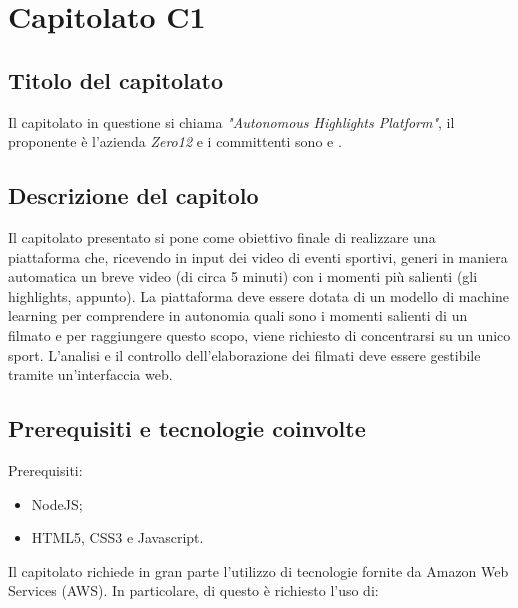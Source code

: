 \section{Capitolato C1}
\subsection{Titolo del capitolato}
Il capitolato in questione si chiama \textit{"Autonomous Highlights Platform"}, il proponente \`e l'azienda \textit{Zero12} e i committenti sono \VT{} e \CR{}.

\subsection{Descrizione del capitolo}
Il capitolato presentato si pone come obiettivo finale di realizzare una piattaforma che, ricevendo in input dei video di eventi sportivi, generi in maniera automatica un breve video (di circa 5 minuti) con i momenti più salienti (gli highlights, appunto).
La piattaforma deve essere dotata di un modello di machine learning per comprendere in autonomia quali sono i momenti salienti di un filmato e per raggiungere questo scopo, viene richiesto di concentrarsi su un unico sport.
L'analisi e il controllo dell'elaborazione dei filmati deve essere gestibile tramite un'interfaccia web.

\subsection{Prerequisiti e tecnologie coinvolte}
Prerequisiti:
\begin{itemize}
\item NodeJS;
\item HTML5, CSS3 e Javascript.
\end{itemize}
Il capitolato richiede in gran parte l'utilizzo di tecnologie fornite da Amazon Web Services (AWS).
In particolare, di questo \`e richiesto l'uso di:

